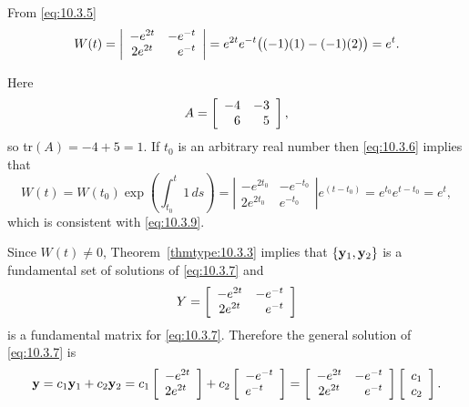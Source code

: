 \begin{examplesolution}
 From \eqref{eq:10.3.5}
\begin{equation}
  \label{eq:10.3.9}W(t)=\left|
  \begin{array}{cc}
    -e^{2t} & -e^{-t}       \\
    2e^{2t} & \hfill e^{-t}
  \end{array}\right|= e^{2t}e^{-t}\bigl((-1)(1)-(-1)(2)\bigr)=e^{t}.
\end{equation}

 Here
\[
  A=\left[\begin{array}{rr} -4&-3\\6&5\end{array}\right],
\]
so tr$(A)=-4+5=1$. If $t_{0}$ is an arbitrary real number then \eqref{eq:10.3.6} implies that
\[
  W(t)=W(t_{0})\exp{\left(\int_{t_{0}}^{t}1\,ds\right)}= \left|
  \begin{array}{cc}
    -e^{2t_{0}} & -e^{-t_{0}} \\
    2e^{2t_{0}} & e^{-t_{0}}
  \end{array}\right|e^{(t-t_{0})}=e^{t_{0}}e^{t-t_{0}}=e^{t},
\]
which is consistent with \eqref{eq:10.3.9}.

 Since $W(t)\ne0$, Theorem~\ref{thmtype:10.3.3} implies that
$\{{\bf y}_{1},{\bf y}_{2}\}$ is a fundamental set of solutions of \eqref{eq:10.3.7} and
\[
  Y=\left[
  \begin{array}{cc}
    -e^{2t} & -e^{-t}       \\
    2e^{2t} & \hfill e^{-t}
  \end{array}\right]
\]
is a fundamental matrix for \eqref{eq:10.3.7}. Therefore the general solution of \eqref{eq:10.3.7}
is
\begin{equation}
  \label{eq:10.3.10}{\bf y}=c_{1}{\bf y}_{1}+c_{2}{\bf y}_{2}= c_{1}\twocol{-e^{2t}}{2e^{2t}}+c_{2}\twocol{-e^{-t}}{e^{-t}}=\left[
  \begin{array}{cc}
    -e^{2t} & -e^{-t}       \\
    2e^{2t} & \hfill e^{-t}
  \end{array}\right] \left[
  \begin{array}{c}
    c_{1} \\
    c_{2}
  \end{array}\right].
\end{equation}


\end{examplesolution}
